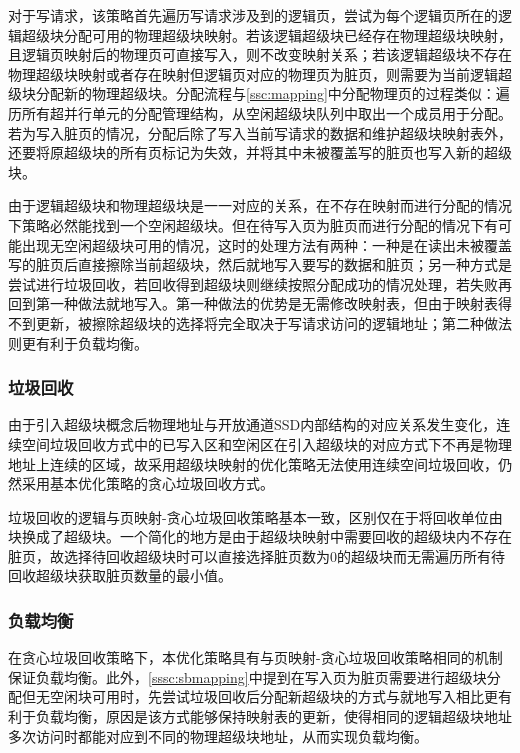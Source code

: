对于写请求，该策略首先遍历写请求涉及到的逻辑页，尝试为每个逻辑页所在的逻辑超级块分配可用的物理超级块映射。若该逻辑超级块已经存在物理超级块映射，且逻辑页映射后的物理页可直接写入，则不改变映射关系；若该逻辑超级块不存在物理超级块映射或者存在映射但逻辑页对应的物理页为脏页，则需要为当前逻辑超级块分配新的物理超级块。分配流程与\ref{ssc:mapping}中分配物理页的过程类似：遍历所有超并行单元的分配管理结构，从空闲超级块队列中取出一个成员用于分配。若为写入脏页的情况，分配后除了写入当前写请求的数据和维护超级块映射表外，还要将原超级块的所有页标记为失效，并将其中未被覆盖写的脏页也写入新的超级块。

由于逻辑超级块和物理超级块是一一对应的关系，在不存在映射而进行分配的情况下策略必然能找到一个空闲超级块。但在待写入页为脏页而进行分配的情况下有可能出现无空闲超级块可用的情况，这时的处理方法有两种：一种是在读出未被覆盖写的脏页后直接擦除当前超级块，然后就地写入要写的数据和脏页；另一种方式是尝试进行垃圾回收，若回收得到超级块则继续按照分配成功的情况处理，若失败再回到第一种做法就地写入。第一种做法的优势是无需修改映射表，但由于映射表得不到更新，被擦除超级块的选择将完全取决于写请求访问的逻辑地址；第二种做法则更有利于负载均衡。

\subsubsection{垃圾回收}
由于引入超级块概念后物理地址与开放通道SSD内部结构的对应关系发生变化，连续空间垃圾回收方式中的已写入区和空闲区在引入超级块的对应方式下不再是物理地址上连续的区域，故采用超级块映射的优化策略无法使用连续空间垃圾回收，仍然采用基本优化策略的贪心垃圾回收方式。

垃圾回收的逻辑与页映射-贪心垃圾回收策略基本一致，区别仅在于将回收单位由块换成了超级块。一个简化的地方是由于超级块映射中需要回收的超级块内不存在脏页，故选择待回收超级块时可以直接选择脏页数为0的超级块而无需遍历所有待回收超级块获取脏页数量的最小值。

\subsubsection{负载均衡}
在贪心垃圾回收策略下，本优化策略具有与页映射-贪心垃圾回收策略相同的机制保证负载均衡。此外，\ref{sssc:sbmapping}中提到在写入页为脏页需要进行超级块分配但无空闲块可用时，先尝试垃圾回收后分配新超级块的方式与就地写入相比更有利于负载均衡，原因是该方式能够保持映射表的更新，使得相同的逻辑超级块地址多次访问时都能对应到不同的物理超级块地址，从而实现负载均衡。


